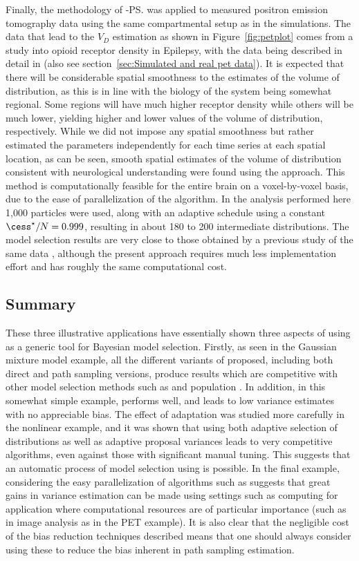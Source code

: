 Finally, the methodology of \smc[2]-\ps was applied to measured positron emission tomography data using the same compartmental setup as in the simulations. The data that lead to the $V_D$ estimation as shown in Figure~\ref{fig:petplot} comes from a study into opioid receptor density in Epilepsy, with the data being described in detail in \cite{Jiang:2009kf} (also see section~\ref{sec:Simulated and real pet data}). It is expected that there will be considerable spatial smoothness to the estimates of the volume of distribution, as this is in line with the biology of the system being somewhat regional. Some regions will have much higher receptor density while others will be much lower, yielding higher and lower values of the volume of distribution, respectively. While we did not impose any spatial smoothness but rather estimated the parameters independently for each time series at each spatial location, as can be seen, smooth spatial estimates of the volume of distribution consistent with neurological understanding were found using the approach. This method is computationally feasible for the entire brain on a voxel-by-voxel basis, due to the ease of parallelization of the \smc algorithm. In the analysis performed here 1,000 particles were used, along with an adaptive schedule using a constant $\cess^\star/N = 0.999$, resulting in about 180 to 200 intermediate distributions. The model selection results are very close to those obtained by a previous study of the same data \cite{Zhou2013}, although the present approach requires much less implementation effort and has roughly the same computational cost.

\subsection{Summary}

These three illustrative applications have essentially shown three aspects of using \smc as a generic tool for Bayesian model selection. Firstly, as seen in the Gaussian mixture model example, all the different variants of \smc proposed, including both direct and path sampling versions, produce results which are competitive with other model selection methods such as \rjmcmc and population \mcmc. In addition, in this somewhat simple example, \smc[2] performs well, and leads to low variance estimates with no appreciable bias. The effect of adaptation was studied more carefully in the nonlinear \ode example, and it was shown that using both adaptive selection of distributions as well as adaptive proposal variances leads to very competitive algorithms, even against those with significant manual tuning. This suggests that an automatic process of model selection using \smc[2] is possible. In the final example, considering the easy parallelization of algorithms such as \smc[2] suggests that great gains in variance estimation can be made using settings such as \gpu computing for application where computational resources are of particular importance (such as in image analysis as in the PET example). It is also clear that the negligible cost of the bias reduction techniques described means that one should always consider using these to reduce the bias inherent in path sampling estimation.

